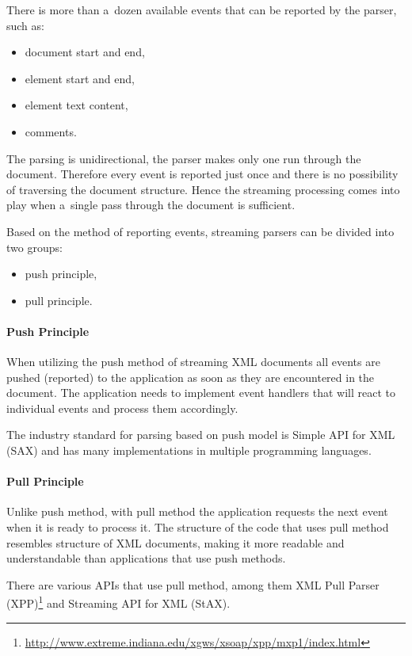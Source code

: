 \documentclass[11pt,oneside,final]{fithesis2}
\begin{document}
There is more than a~dozen available events that can be reported by the parser, such as:
\begin{itemize}
\item document start and end,
\item element start and end,
\item element text content,
\item comments.  
\end{itemize}

The parsing is unidirectional, the parser makes only one run through the document. Therefore every event is reported just once and there is no possibility of traversing the document structure. Hence the streaming processing comes into play when a~single pass through the document is sufficient.

Based on the method of reporting events, streaming parsers can be divided into two groups:
\begin{itemize}
\item push principle,
\item pull principle.
\end{itemize}

\paragraph*{Push Principle} When utilizing the push method of streaming XML documents all events are pushed (reported) to the application as soon as they are encountered in the document. The application needs to implement event handlers that will react to individual events and process them accordingly.

The industry standard for parsing based on push model is Simple API for XML (SAX) and has many implementations in multiple programming languages.

\paragraph*{Pull Principle} Unlike push method, with pull method the application requests the next event when it is ready to process it. The structure of the code that uses pull method resembles structure of XML documents, making it more readable and understandable than applications that use push methods.

There are various APIs that use pull method, among them XML Pull Parser (XPP)\footnote{\url{http://www.extreme.indiana.edu/xgws/xsoap/xpp/mxp1/index.html}}  and Streaming API for XML (StAX).
\end{document}
